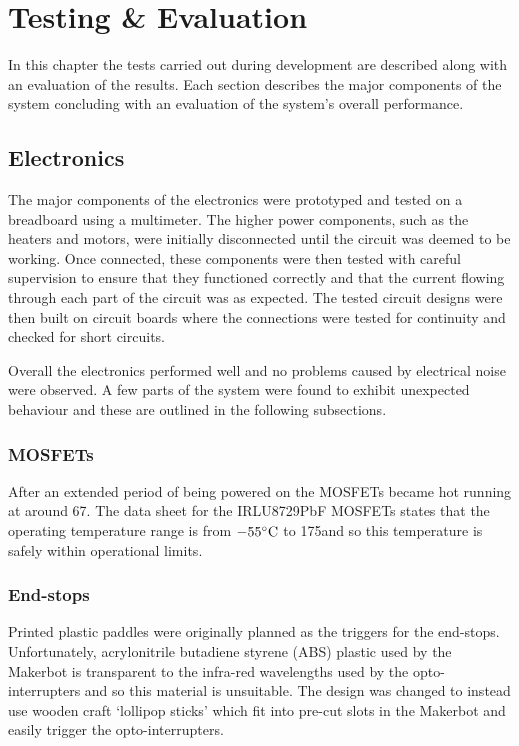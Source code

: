 \chapter{Testing \& Evaluation}
	
	In this chapter the tests carried out during development are described along
	with an evaluation of the results. Each section describes the major components
	of the system concluding with an evaluation of the system's overall
	performance.
	
	\section{Electronics}
		
		The major components of the electronics were prototyped and tested on a
		breadboard using a multimeter. The higher power components, such as the
		heaters and motors, were initially disconnected until the circuit was deemed
		to be working. Once connected, these components were then tested with
		careful supervision to ensure that they functioned correctly and that the
		current flowing through each part of the circuit was as expected. The tested
		circuit designs were then built on circuit boards where the connections were
		tested for continuity and checked for short circuits.
		
		Overall the electronics performed well and no problems caused by electrical
		noise were observed. A few parts of the system were found to exhibit
		unexpected behaviour and these are outlined in the following subsections.
		
		\subsection{MOSFETs}
			
			After an extended period of being powered on the MOSFETs became hot
			running at around 67\dC. The data sheet for the IRLU8729PbF MOSFETs states
			that the operating temperature range is from $-55^\circ\textrm{C}{}$ to 175\dC and so
			this temperature is safely within operational limits.
			
		
		\subsection{End-stops}
			
			Printed plastic paddles were originally planned as the triggers for the
			end-stops. Unfortunately, acrylonitrile butadiene styrene (ABS) plastic
			used by the Makerbot is transparent to the infra-red wavelengths used by
			the opto-interrupters and so this material is unsuitable. The design was
			changed to instead use wooden craft `lollipop sticks' which fit into
			pre-cut slots in the Makerbot and easily trigger the opto-interrupters.
		
